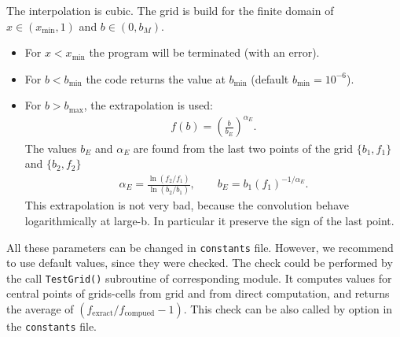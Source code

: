 \documentclass[prd,nofootinbib,eqsecnum,final]{revtex4}
\renewcommand{\(}{\left(}
\renewcommand{\)}{\right)}
\renewcommand{\[}{\left[}
\renewcommand{\]}{\right]}
\begin{document}
The interpolation is cubic. The grid is build for the finite domain of $x\in(x_{\min},1)$ and $b\in(0,b_M)$. 
\begin{itemize}
\item For $x<x_{\min}$ the program will be terminated (with an error). 
\item For $b<b_{\min}$ the code returns the value at $b_{\min}$ (default $b_{\min}=10^{-6}$). 
\item For $b>b_{\max}$, the extrapolation is used:
\begin{eqnarray}
f(b)=\(\frac{b}{b_E}\)^{\alpha_E}.
\end{eqnarray}
The values $b_E$ and $\alpha_E$ are found from the last two points of the grid $\{b_1,f_1\}$ and $\{b_2,f_2\}$
\begin{eqnarray}
\alpha_E=\frac{\ln(f_2/f_1)}{\ln(b_2/b_1)},\qquad b_E=b_1 (f_1)^{-1/\alpha_E}.
\end{eqnarray}
This extrapolation is not very bad, because the convolution behave logarithmically at large-b. In particular it preserve the sign of the last point.
\end{itemize}
All these parameters can be changed in \texttt{constants} file.  However, we recommend to use default values, since they were checked. The check could be performed by the call \texttt{TestGrid()} subroutine of corresponding module. It computes values for central points of grids-cells from grid and from direct computation, and returns the average of $(f_{\text{exract}}/f_{\text{compued}}-1)$. This check can be also called by option in the \texttt{constants} file.
\end{document}

